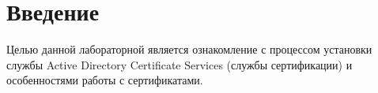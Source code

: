 \section{Введение}
    Целью данной лабораторной является ознакомление с процессом  установки службы Active Directory Certificate Services (службы сертификации) и особенностями работы с сертификатами.\par
